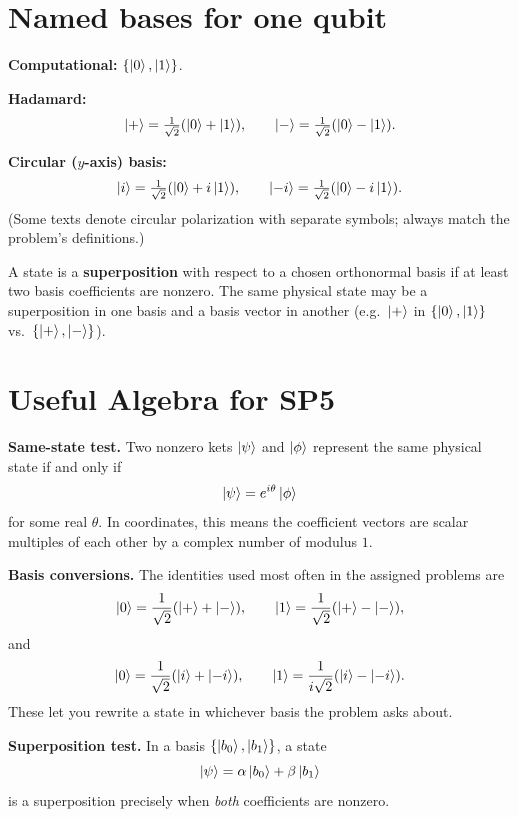 \section{Named bases for one qubit}

\textbf{Computational:} $\{\left|0\right\rangle,\left|1\right\rangle\}$.

\textbf{Hadamard:}
\[
\left|+\right\rangle=\tfrac{1}{\sqrt{2}}(\left|0\right\rangle+\left|1\right\rangle),\qquad
\left|-\right\rangle=\tfrac{1}{\sqrt{2}}(\left|0\right\rangle-\left|1\right\rangle).
\]

\textbf{Circular ($y$-axis) basis:}
\[
\left|i\right\rangle=\tfrac{1}{\sqrt{2}}(\left|0\right\rangle+i\left|1\right\rangle),\qquad
\left|-i\right\rangle=\tfrac{1}{\sqrt{2}}(\left|0\right\rangle-i\left|1\right\rangle).
\]
(Some texts denote circular polarization with separate symbols; always match the problem's definitions.)

A state is a \textbf{superposition} with respect to a chosen orthonormal basis if at least two basis coefficients are nonzero. The same physical state may be a superposition in one basis and a basis vector in another (e.g.\ $\left|+\right\rangle$ in $\{\left|0\right\rangle,\left|1\right\rangle\}$ vs.\ $\{\left|+\right\rangle,\left|-\right\rangle\}$).

\section{Useful Algebra for SP5}

\textbf{Same-state test.} Two nonzero kets $\left|\psi\right\rangle$ and $\left|\phi\right\rangle$ represent the same physical state if and only if
\[
\left|\psi\right\rangle=e^{i\theta}\left|\phi\right\rangle
\]
for some real $\theta$. In coordinates, this means the coefficient vectors are scalar multiples of each other by a complex number of modulus $1$.

\textbf{Basis conversions.} The identities used most often in the assigned problems are
\[
\left|0\right\rangle=\frac{1}{\sqrt{2}}(\left|+\right\rangle+\left|-\right\rangle),
\qquad
\left|1\right\rangle=\frac{1}{\sqrt{2}}(\left|+\right\rangle-\left|-\right\rangle),
\]
and
\[
\left|0\right\rangle=\frac{1}{\sqrt{2}}(\left|i\right\rangle+\left|-i\right\rangle),
\qquad
\left|1\right\rangle=\frac{1}{i\sqrt{2}}(\left|i\right\rangle-\left|-i\right\rangle).
\]
These let you rewrite a state in whichever basis the problem asks about.

\textbf{Superposition test.} In a basis $\{\left|b_0\right\rangle,\left|b_1\right\rangle\}$, a state
\[
\left|\psi\right\rangle=\alpha\left|b_0\right\rangle+\beta\left|b_1\right\rangle
\]
is a superposition precisely when \emph{both} coefficients are nonzero.

